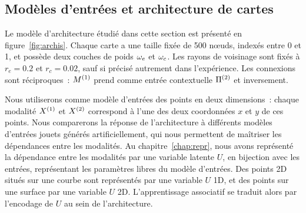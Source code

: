 \documentclass[../main]{subfiles}
\begin{document}
\subsection{Modèles d'entrées et architecture de cartes}

Le modèle d'architecture étudié dans cette section est présenté en figure~\ref{fig:archis}.
Chaque carte a une taille fixée de 500 n\oe{}uds, indexés entre 0 et 1, et possède deux couches de poids $\omega_e$ et $\omega_c$. Les rayons de voisinage sont fixés à $r_e = 0.2$ et $r_c = 0.02$, sauf si précisé autrement dans l'expérience. Les connexions sont réciproques~: $M^{({1})}$ prend comme entrée contextuelle $\Pi^{({2})}$ et inversement.

Nous utiliserons comme modèle d'entrées des points en deux dimensions~: chaque modalité $X^{({1})}$ et $X^{({2})}$ correspond à l'une des deux coordonnées $x$ et $y$ de ces points. Nous comparerons la réponse de l'architecture à différents modèles d'entrées jouets générés artificiellement, qui nous permettent de maîtriser les dépendances entre les modalités.
Au chapitre~\ref{chap:repr}, nous avons représenté la dépendance entre les modalités par une variable latente $U$, en bijection avec les entrées, représentant les paramètres libres du modèle d'entrées. 
Des points 2D situés sur une courbe sont représentés par une variable $U$ 1D, et des points sur une surface par une variable $U$ 2D. L'apprentissage associatif se traduit alors par l'encodage de $U$ au sein de l'architecture.
\end{document}
